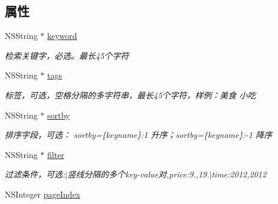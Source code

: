 \subsection*{属性}
\begin{DoxyCompactItemize}
\item 
\hypertarget{interface_b_m_k_cloud_search_info_a90f2d3ef36a31112ca8fdb6d70fabea6}{}N\+S\+String $\ast$ \hyperlink{interface_b_m_k_cloud_search_info_a90f2d3ef36a31112ca8fdb6d70fabea6}{keyword}\label{interface_b_m_k_cloud_search_info_a90f2d3ef36a31112ca8fdb6d70fabea6}

\begin{DoxyCompactList}\small\item\em 检索关键字，必选。最长45个字符 \end{DoxyCompactList}\item 
\hypertarget{interface_b_m_k_cloud_search_info_ae2c16f1281195d1fbf738ac23552d8f7}{}N\+S\+String $\ast$ \hyperlink{interface_b_m_k_cloud_search_info_ae2c16f1281195d1fbf738ac23552d8f7}{tags}\label{interface_b_m_k_cloud_search_info_ae2c16f1281195d1fbf738ac23552d8f7}

\begin{DoxyCompactList}\small\item\em 标签，可选，空格分隔的多字符串，最长45个字符，样例：美食 小吃 \end{DoxyCompactList}\item 
N\+S\+String $\ast$ \hyperlink{interface_b_m_k_cloud_search_info_ab0d42d1b9e841c5e538e457e819a07f7}{sortby}
\begin{DoxyCompactList}\small\item\em 排序字段，可选： sortby=\{keyname\}\+:1 升序；sortby=\{keyname\}\+:-\/1 降序 \end{DoxyCompactList}\item 
N\+S\+String $\ast$ \hyperlink{interface_b_m_k_cloud_search_info_a65d91501d19f2a6aa027de6f9e5bc837}{filter}
\begin{DoxyCompactList}\small\item\em 过滤条件，可选\+:\textquotesingle{}$\vert$\textquotesingle{}竖线分隔的多个key-\/value对,price\+:9.,19.$\vert$time\+:2012,2012 \end{DoxyCompactList}\item 
\hypertarget{interface_b_m_k_cloud_search_info_aeea99c3907cafe38def8105839ad4c8a}{}N\+S\+Integer \hyperlink{interface_b_m_k_cloud_search_info_aeea99c3907cafe38def8105839ad4c8a}{page\+Index}\label{interface_b_m_k_cloud_search_info_aeea99c3907cafe38def8105839ad4c8a}


\end{DoxyCompactItemize}
